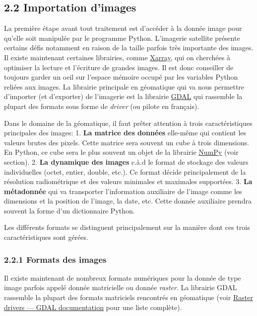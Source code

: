 \documentclass[
]{article}
\begin{document}
\subsection{\texorpdfstring{{2.2} Importation
d'images}{2.2 Importation d'images}}\label{importation-dimages}

La première étape avant tout traitement est d'accéder à la donnée image
pour qu'elle soit manipulée par le programme Python. L'imagerie
satellite présente certains défis notamment en raison de la taille
parfois très importante des images. Il existe maintenant certaines
librairies, comme \href{https://docs.xarray.dev/en/stable/}{Xarray}, qui
on cherchées à optimiser la lecture et l'écriture de grandes images. Il
est donc conseiller de toujours garder un oeil sur l'espace mémoire
occupé par les variables Python reliées aux images. La librairie
principale en géomatique qui va nous permettre d'importer (et
d'exporter) de l'imagerie est la librairie \href{https://gdal.org}{GDAL}
qui rassemble la plupart des formats sous forme de \emph{driver} (ou
pilote en français).

Dans le domaine de la géomatique, il faut prêter attention à trois
caractéristiques principales des images: 1. \textbf{La matrice des
données} elle-même qui contient les valeurs brutes des pixels. Cette
matrice sera souvent un cube à trois dimensions. En Python, ce cube sera
le plus souvent un objet de la librairie
\href{https://numpy.org/}{NumPy} (voir section). 2. \textbf{La dynamique
des images} c.à.d le format de stockage des valeurs individuelles
(octet, entier, double, etc.). Ce format décide principalement de la
résolution radiométrique et des valeurs minimales et maximales
supportées. 3. \textbf{La métadonnée} qui va transporter l'information
auxiliaire de l'image comme les dimensions et la position de l'image, la
date, etc. Cette donnée auxiliaire prendra souvent la forme d'un
dictionnaire Python.

Les différents formats se distinguent principalement sur la manière dont
ces trois caractéristiques sont gérées.

\subsubsection{\texorpdfstring{{2.2.1} Formats des
images}{2.2.1 Formats des images}}\label{formats-des-images}

Il existe maintenant de nombreux formats numériques pour la donnée de
type image parfois appelé donnée matricielle ou donnée \emph{raster}. La
librairie GDAL rassemble la plupart des formats matriciels rencontrés en
géomatique (voir
\href{https://gdal.org/en/latest/drivers/raster/index.html}{Raster
drivers --- GDAL documentation} pour une liste complète).
\end{document}
